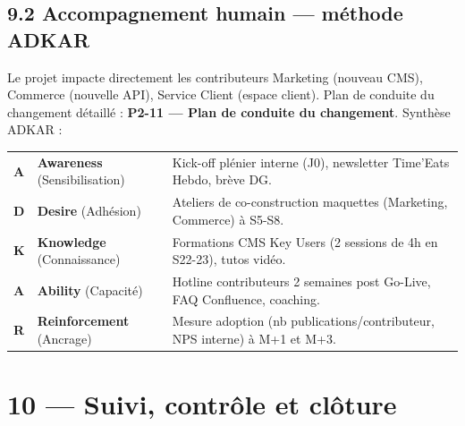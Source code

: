 \documentclass[11pt,a4paper,oneside]{report}
\begin{document}
\subsection*{9.2 Accompagnement humain --- méthode ADKAR}
Le projet impacte directement les contributeurs Marketing (nouveau CMS), Commerce (nouvelle API), Service Client (espace client). Plan de conduite du changement détaillé : \textbf{P2-11 --- Plan de conduite du changement}. Synthèse ADKAR :

\renewcommand{\arraystretch}{1.4}
\begin{tabularx}{\textwidth}{L{1.5cm} L{3cm} Y}
\toprule
{} &  &  \\
\midrule
\textbf{A} & \textbf{Awareness} (Sensibilisation) & Kick-off plénier interne (J0), newsletter Time'Eats Hebdo, brève DG. \\
\textbf{D} & \textbf{Desire} (Adhésion)           & Ateliers de co-construction maquettes (Marketing, Commerce) à S5-S8. \\
\textbf{K} & \textbf{Knowledge} (Connaissance)    & Formations CMS Key Users (2 sessions de 4h en S22-23), tutos vidéo. \\
\textbf{A} & \textbf{Ability} (Capacité)          & Hotline contributeurs 2 semaines post Go-Live, FAQ Confluence, coaching. \\
\textbf{R} & \textbf{Reinforcement} (Ancrage)     & Mesure adoption (nb publications/contributeur, NPS interne) à M+1 et M+3. \\
\bottomrule
\end{tabularx}

\newpage
\section*{10 --- Suivi, contrôle et clôture}
\end{document}
